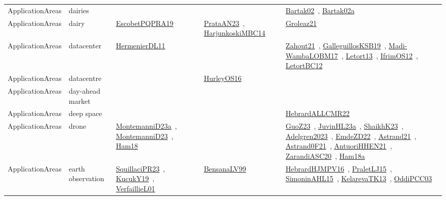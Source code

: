 {\begin{longtable}{lp{3cm}>{\raggedright\arraybackslash}p{6cm}>{\raggedright\arraybackslash}p{6cm}>{\raggedright\arraybackslash}p{8cm}}
ApplicationAreas & dairies &  &  & \href{works/Bartak02.pdf}{Bartak02}~\cite{Bartak02}, \href{works/Bartak02a.pdf}{Bartak02a}~\cite{Bartak02a}\\
ApplicationAreas & dairy & \href{works/EscobetPQPRA19.pdf}{EscobetPQPRA19}~\cite{EscobetPQPRA19} & \href{works/PrataAN23.pdf}{PrataAN23}~\cite{PrataAN23}, \href{works/HarjunkoskiMBC14.pdf}{HarjunkoskiMBC14}~\cite{HarjunkoskiMBC14} & \href{works/Groleaz21.pdf}{Groleaz21}~\cite{Groleaz21}\\
ApplicationAreas & datacenter & \href{works/HermenierDL11.pdf}{HermenierDL11}~\cite{HermenierDL11} &  & \href{works/Zahout21.pdf}{Zahout21}~\cite{Zahout21}, \href{works/GalleguillosKSB19.pdf}{GalleguillosKSB19}~\cite{GalleguillosKSB19}, \href{works/Madi-WambaLOBM17.pdf}{Madi-WambaLOBM17}~\cite{Madi-WambaLOBM17}, \href{works/Letort13.pdf}{Letort13}~\cite{Letort13}, \href{works/IfrimOS12.pdf}{IfrimOS12}~\cite{IfrimOS12}, \href{works/LetortBC12.pdf}{LetortBC12}~\cite{LetortBC12}\\
ApplicationAreas & datacentre &  & \href{works/HurleyOS16.pdf}{HurleyOS16}~\cite{HurleyOS16} & \\
ApplicationAreas & day-ahead market &  &  & \\
ApplicationAreas & deep space &  &  & \href{works/HebrardALLCMR22.pdf}{HebrardALLCMR22}~\cite{HebrardALLCMR22}\\
ApplicationAreas & drone & \href{works/MontemanniD23a.pdf}{MontemanniD23a}~\cite{MontemanniD23a}, \href{works/MontemanniD23.pdf}{MontemanniD23}~\cite{MontemanniD23}, \href{works/Ham18.pdf}{Ham18}~\cite{Ham18} &  & \href{works/GuoZ23.pdf}{GuoZ23}~\cite{GuoZ23}, \href{works/JuvinHL23a.pdf}{JuvinHL23a}~\cite{JuvinHL23a}, \href{works/ShaikhK23.pdf}{ShaikhK23}~\cite{ShaikhK23}, \href{works/Adelgren2023.pdf}{Adelgren2023}~\cite{Adelgren2023}, \href{works/EmdeZD22.pdf}{EmdeZD22}~\cite{EmdeZD22}, \href{works/Astrand21.pdf}{Astrand21}~\cite{Astrand21}, \href{works/Astrand0F21.pdf}{Astrand0F21}~\cite{Astrand0F21}, \href{works/AntuoriHHEN21.pdf}{AntuoriHHEN21}~\cite{AntuoriHHEN21}, \href{works/ZarandiASC20.pdf}{ZarandiASC20}~\cite{ZarandiASC20}, \href{works/Ham18a.pdf}{Ham18a}~\cite{Ham18a}\\
ApplicationAreas & earth observation & \href{works/SquillaciPR23.pdf}{SquillaciPR23}~\cite{SquillaciPR23}, \href{works/KucukY19.pdf}{KucukY19}~\cite{KucukY19}, \href{works/VerfaillieL01.pdf}{VerfaillieL01}~\cite{VerfaillieL01} & \href{works/BensanaLV99.pdf}{BensanaLV99}~\cite{BensanaLV99} & \href{works/HebrardHJMPV16.pdf}{HebrardHJMPV16}~\cite{HebrardHJMPV16}, \href{works/PraletLJ15.pdf}{PraletLJ15}~\cite{PraletLJ15}, \href{works/SimoninAHL15.pdf}{SimoninAHL15}~\cite{SimoninAHL15}, \href{works/KelarevaTK13.pdf}{KelarevaTK13}~\cite{KelarevaTK13}, \href{works/OddiPCC03.pdf}{OddiPCC03}~\cite{OddiPCC03}\\

\end{longtable}}

